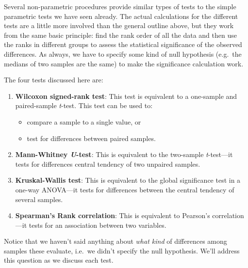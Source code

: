 \documentclass[
]{book}
\providecommand{\tightlist}{%
  \setlength{\itemsep}{0pt}\setlength{\parskip}{0pt}}
\begin{document}
Several non-parametric procedures provide similar types of tests to the simple parametric tests we have seen already. The actual calculations for the different tests are a little more involved than the general outline above, but they work from the same basic principle: find the rank order of all the data and then use the ranks in different groups to assess the statistical significance of the observed differences. As always, we have to specify some kind of null hypothesis (e.g.~the medians of two samples are the same) to make the significance calculation work.

The four tests discussed here are:

\begin{enumerate}
\def\labelenumi{\arabic{enumi})}
\item
  \textbf{Wilcoxon signed-rank test}: This test is equivalent to a one-sample and paired-sample \emph{t}-test. This test can be used to:

  \begin{itemize}
  \tightlist
  \item
    compare a sample to a single value, or
  \item
    test for differences between paired samples.
  \end{itemize}
\item
  \textbf{Mann-Whitney \emph{U}-test}: This is equivalent to the two-sample \emph{t}-test---it tests for differences central tendency of two unpaired samples.
\item
  \textbf{Kruskal-Wallis test}: This is equivalent to the global significance test in a one-way ANOVA---it tests for differences between the central tendency of several samples.
\item
  \textbf{Spearman's Rank correlation}: This is equivalent to Pearson's correlation---it tests for an association between two variables.
\end{enumerate}

Notice that we haven't said anything about \emph{what kind} of differences among samples these evaluate, i.e.~we didn't specify the null hypothesis. We'll address this question as we discuss each test.
\end{document}
